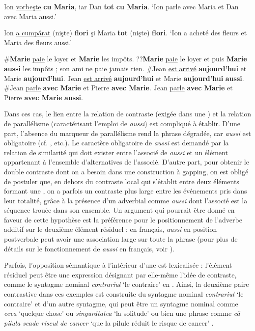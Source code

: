 \ex Ion \uline{vorbeşte} \textbf{cu Maria}, iar Dan \textbf{tot} \textbf{cu Maria}. \label{ch2:ex157b} 
\glt ‘Ion parle avec Maria et Dan avec Maria aussi.’

\ex Ion \uline{a cumpărat} (nişte) \textbf{flori} şi Maria \textbf{tot} (nişte) \textbf{flori}. \label{ch2:ex157c}
\glt ‘Ion a acheté des fleurs et Maria des fleurs aussi.’  
\z
\z

\ea \label{ch2:ex158}
\ea \#\textbf{Marie} \uline{paie} le loyer et \textbf{Marie} les impôts. \label{ch2:ex158a}
\ex ??\textbf{Marie} \uline{paie} le loyer et puis \textbf{Marie aussi} les impôts ; son ami ne paie jamais rien. \label{ch2:ex158b}
\ex \#Jean \uline{est arrivé} \textbf{aujourd’hui} et Marie \textbf{aujourd’hui}.
\ex Jean \uline{est arrivé} \textbf{aujourd’hui} et Marie \textbf{aujourd’hui} \textbf{aussi}.
\ex \#Jean \uline{parle} \textbf{avec Marie} et Pierre \textbf{avec Marie}.
\ex Jean \uline{parle} \textbf{avec Marie} et Pierre \textbf{avec Marie} \textbf{aussi}.
\z
\z

Dans ces cas, le lien entre la relation de contraste (exigée dans une ) et la relation de parallélisme (caractérisant l’emploi de \textit{aussi}) est compliqué à établir. D’une part, l’absence du marqueur de parallélisme rend la phrase dégradée, car \textit{aussi} est obligatoire (cf. \citealt{Saebo2004,AmsiliEtAl2010}, etc.). Le caractère obligatoire de \textit{aussi} est demandé par la relation de similarité qui doit exister entre l’associé de \textit{aussi} et un élément appartenant à l’ensemble d’alternatives de l’associé. D’autre part, pour obtenir le double contraste dont on a besoin dans une construction à gapping, on est obligé de postuler que, en dehors du contraste local qui s’établit entre deux éléments formant une , on a parfois un contraste plus large entre les événements pris dans leur totalité, grâce à la présence d’un adverbial comme \textit{aussi} dont l’associé est la séquence trouée dans son ensemble. Un argument qui pourrait être donné en faveur de cette hypothèse est la préférence pour le positionnement de l’adverbe additif sur le deuxième élément résiduel : en français, \textit{aussi} en position postverbale peut avoir une association large sur toute la phrase (pour plus de détails sur le fonctionnement de \textit{aussi} en français, voir \citealt{Winterstein2010}).

Parfois, l’opposition sémantique à l’intérieur d’une  est lexicalisée : l’élément résiduel peut être une expression désignant par elle-même l’idée de contraste, comme le syntagme nominal \textit{contrariul} ‘le contraire’ en . Ainsi, la deuxième paire contrastive dans ces exemples est construite du syntagme nominal \textit{contrariul} ‘le contraire’ et d’un autre syntagme, qui peut être un syntagme nominal comme \textit{ceva} ‘quelque chose’  ou \textit{singurătatea} ‘la solitude’  ou bien une phrase comme \textit{că pilula scade riscul de cancer} ‘que la pilule réduit le risque de cancer’ .

